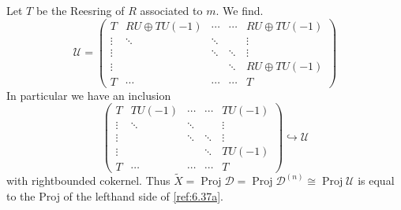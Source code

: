 \documentclass{amsproc}
\def\Dscr{{\mathcal D}}
\def\Uscr{{\mathcal U}}
\def\Proj{\operatorname {Proj}}
\theoremstyle{definition}
\theoremstyle{remark}
\numberwithin{equation}{section}
\numberwithin{table}{section}
\numberwithin{figure}{section}
\begin{document}
Let $T$ be the Reesring of $R$ associated to $m$. We find.
\[
\Uscr=
\begin{pmatrix}
T          &RU\oplus TU(-1)        &\cdots   &\cdots   &RU\oplus TU(-1)      \\
\vdots     &\ddots     &\ddots   &         &\vdots   \\
\vdots     &           &\ddots   &\ddots   &\vdots   \\
\vdots     &           &         &\ddots   &RU\oplus TU(-1)      \\
T          &\cdots     &\cdots   &\cdots   &T    
\end{pmatrix}
\]
In particular we have an inclusion 
\begin{equation}
\label{ref:6.37a}
\begin{pmatrix}
T          &TU(-1)        &\cdots   &\cdots   &TU(-1)      \\
\vdots     &\ddots     &\ddots   &         &\vdots   \\
\vdots     &           &\ddots   &\ddots   &\vdots   \\
\vdots     &           &         &\ddots   &TU(-1)      \\
T          &\cdots     &\cdots   &\cdots   &T    
\end{pmatrix}
\hookrightarrow \Uscr
\end{equation}
with rightbounded cokernel. Thus $\tilde{X}=\Proj\Dscr=\Proj
\Dscr^{(n)}\cong \Proj \Uscr$ is equal to the Proj of the lefthand
side of \eqref{ref:6.37a}.
\end{document}
